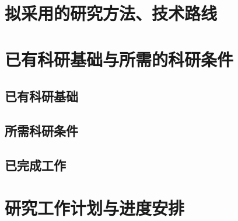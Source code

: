 \documentclass[onecolumn,a4paper,12pt]{article}
\begin{document}
\newpage
\section{拟采用的研究方法、技术路线}

\newpage
\section{已有科研基础与所需的科研条件}

\subsection{已有科研基础}

\subsection{所需科研条件}

\subsection{已完成工作}

\newpage
\section{研究工作计划与进度安排}

\newpage
\small
{}
%

\end{document}
